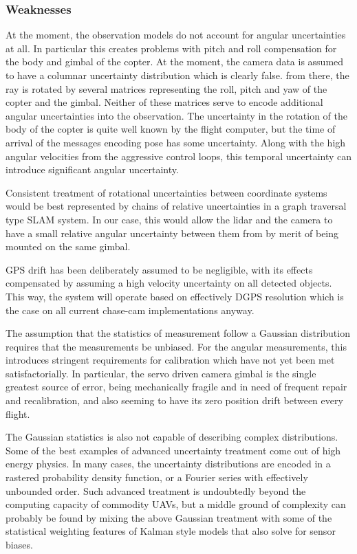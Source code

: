\documentclass[a4paper, 11pt, titlepage]{article}
\begin{document}
    \subsubsection{Weaknesses}
      At the moment, the observation models do not account for angular uncertainties at all.  In particular this creates problems with pitch and roll compensation for the body and gimbal of the copter.
      At the moment, the camera data is assumed to have a columnar uncertainty distribution which is clearly false.  from there, the ray is rotated by several matrices representing the roll, pitch and yaw of the copter and the gimbal.  Neither of these matrices serve to encode additional angular uncertainties into the observation.
      The uncertainty in the rotation of the body of the copter is quite well known by the flight computer, but the time of arrival of the messages encoding pose has some uncertainty.  Along with the high angular velocities from the aggressive control loops, this temporal uncertainty can introduce significant angular uncertainty.

      Consistent treatment of rotational uncertainties between coordinate systems would be best represented by chains of relative uncertainties in a graph traversal type SLAM system.  In our case, this would allow the lidar and the camera to have a small relative angular uncertainty between them from by merit of being mounted on the same gimbal.

      GPS drift has been deliberately assumed to be negligible, with its effects compensated by assuming a high velocity uncertainty on all detected objects.  This way, the system will operate based on effectively DGPS resolution which is the case on all current chase-cam implementations anyway.

      The assumption that the statistics of measurement follow a Gaussian distribution requires that the measurements be unbiased.  For the angular measurements, this introduces stringent requirements for calibration which have not yet been met satisfactorially.  In particular, the servo driven camera gimbal is the single greatest source of error, being mechanically fragile and in need of frequent repair and recalibration, and also seeming to have its zero position drift between every flight.

      The Gaussian statistics is also not capable of describing complex distributions.  Some of the best examples of advanced uncertainty treatment come out of high energy physics.  In many cases, the uncertainty distributions are encoded in a rastered probability density function, or a Fourier series with effectively unbounded order.  Such advanced treatment is undoubtedly beyond the computing capacity of commodity UAVs, but a middle ground of complexity can probably be found by mixing the above Gaussian treatment with some of the statistical weighting features of Kalman style models that also solve for sensor biases.
\end{document}
